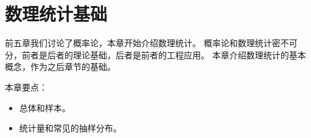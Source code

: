 \chapter{数理统计基础}

前五章我们讨论了概率论，本章开始介绍数理统计。
概率论和数理统计密不可分，前者是后者的理论基础，后者是前者的工程应用。
本章介绍数理统计的基本概念，作为之后章节的基础。

本章要点：
\begin{itemize}
    \item 总体和样本。
    \item 统计量和常见的抽样分布。
\end{itemize}

\newpage


\newpage


\newpage





